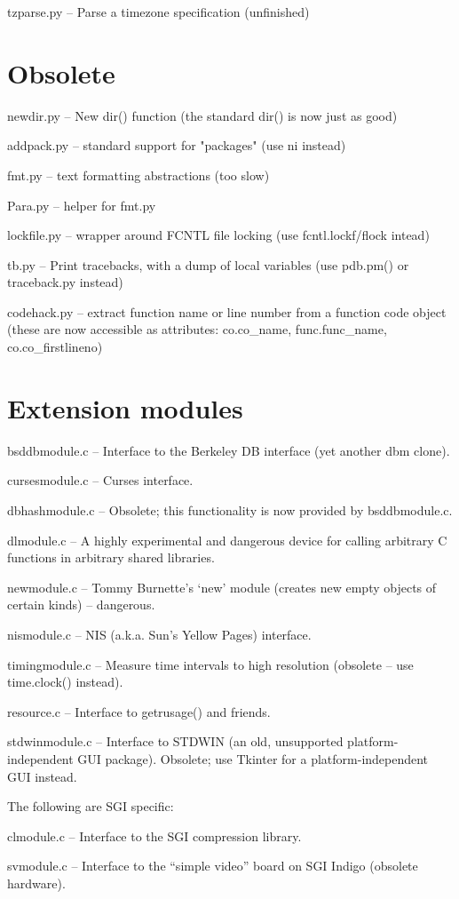 tzparse.py -- Parse a timezone specification (unfinished)


\section{Obsolete}

newdir.py -- New dir() function (the standard dir() is now just as good)

addpack.py -- standard support for "packages" (use ni instead)

fmt.py -- text formatting abstractions (too slow)

Para.py -- helper for fmt.py

lockfile.py -- wrapper around FCNTL file locking (use
fcntl.lockf/flock intead)

tb.py -- Print tracebacks, with a dump of local variables (use
pdb.pm() or traceback.py instead)

codehack.py -- extract function name or line number from a function
code object (these are now accessible as attributes: co.co_name,
func.func_name, co.co_firstlineno)


\section{Extension modules}

bsddbmodule.c -- Interface to the Berkeley DB interface (yet another
dbm clone).

cursesmodule.c -- Curses interface.

dbhashmodule.c -- Obsolete; this functionality is now provided by
bsddbmodule.c.

dlmodule.c --  A highly experimental and dangerous device for calling
arbitrary C functions in arbitrary shared libraries.

newmodule.c -- Tommy Burnette's `new' module (creates new empty
objects of certain kinds) -- dangerous.

nismodule.c -- NIS (a.k.a. Sun's Yellow Pages) interface.

timingmodule.c -- Measure time intervals to high resolution (obsolete
-- use time.clock() instead).

resource.c -- Interface to getrusage() and friends.

stdwinmodule.c -- Interface to STDWIN (an old, unsupported
platform-independent GUI package).  Obsolete; use Tkinter for a
platform-independent GUI instead.

The following are SGI specific:

clmodule.c -- Interface to the SGI compression library.

svmodule.c -- Interface to the ``simple video'' board on SGI Indigo
(obsolete hardware).
